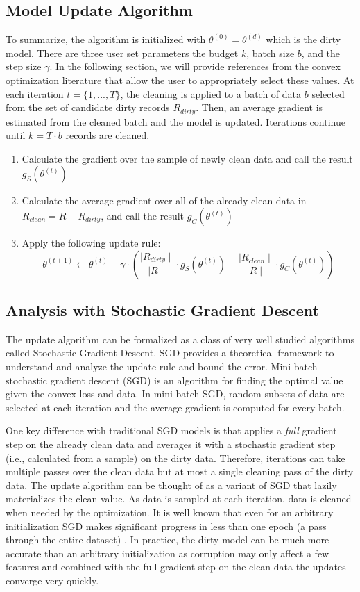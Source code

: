 \subsection{Model Update Algorithm}
To summarize, the algorithm is initialized with $\theta^{(0)} = \theta^{(d)}$ which is the dirty model.
There are three user set parameters the budget $k$, batch size $b$, and the step size $\gamma$.
In the following section, we will provide references from the convex optimization literature that allow the user to appropriately select these values.
At each iteration $t=\{1,...,T\}$, the cleaning is applied to a batch of data $b$ selected from the set of candidate dirty records $R_{dirty}$.
Then, an average gradient is estimated from the cleaned batch and the model is updated.
Iterations continue until $k = T \cdot b$ records are cleaned.

\begin{enumerate}[noitemsep]
	\item Calculate the gradient over the sample of newly clean data and call the result $g_S(\theta^{(t)})$
	\item Calculate the average gradient over all of the already clean data in $R_{clean}=R-R_{dirty}$, and call the result $g_C(\theta^{(t)})$
	\item Apply the following update rule:
	\[
	\theta^{(t+1)} \leftarrow \theta^{(t)} - \gamma \cdot(\frac{\mid R_{dirty} \mid}{\mid R \mid} \cdot g_S(\theta^{(t)}) + \frac{\mid R_{clean} \mid}{\mid R \mid} \cdot  g_C(\theta^{(t)}))
	\]
\end{enumerate} 

\subsection{Analysis with Stochastic Gradient Descent}\label{sgd}
The update algorithm can be formalized as a class of very well studied algorithms called Stochastic Gradient Descent.
SGD provides a theoretical framework to understand and analyze the update rule and bound the error.
Mini-batch stochastic gradient descent (SGD) is an algorithm for finding the optimal value
given the convex loss and data.
In mini-batch SGD, random subsets of data are selected at each iteration and the average gradient is computed for every batch.

One key difference with traditional SGD models is that \sys applies a \emph{full} gradient step on the already clean data and averages it with a stochastic gradient step (i.e., calculated from a sample) on the dirty data. 
Therefore, \sys iterations can take multiple passes over the clean data but at most a single cleaning pass of the dirty data.
The update algorithm can be thought of as a variant of SGD that lazily materializes the clean value.
As data is sampled at each iteration, data is cleaned when needed by the optimization.
It is well known that even for an arbitrary initialization SGD makes significant progress in less than one epoch (a pass through the entire dataset) \cite{bottou2012stochastic}.
In practice, the dirty model can be much more accurate than an arbitrary initialization as corruption may only affect a few features and combined with the full gradient step on the clean data the updates converge very quickly.

